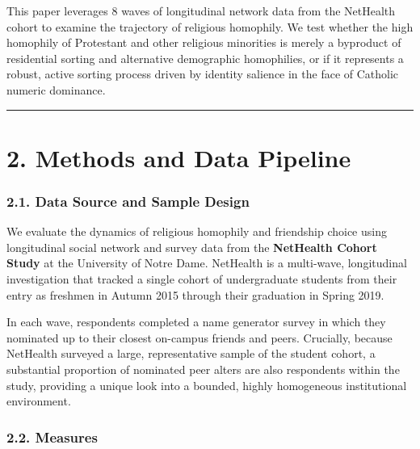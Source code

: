 \documentclass[
  letterpaper,
  DIV=11,
  numbers=noendperiod]{scrartcl}
\begin{document}
This paper leverages 8 waves of longitudinal network data from the
NetHealth cohort to examine the trajectory of religious homophily. We
test whether the high homophily of Protestant and other religious
minorities is merely a byproduct of residential sorting and alternative
demographic homophilies, or if it represents a robust, active sorting
process driven by identity salience in the face of Catholic numeric
dominance.

\begin{center}\rule{0.5\linewidth}{0.5pt}\end{center}

\section{2. Methods and Data Pipeline}\label{methods-and-data-pipeline}

\subsubsection{2.1. Data Source and Sample
Design}\label{data-source-and-sample-design}

We evaluate the dynamics of religious homophily and friendship choice
using longitudinal social network and survey data from the
\textbf{NetHealth Cohort Study} at the University of Notre Dame.
NetHealth is a multi-wave, longitudinal investigation that tracked a
single cohort of undergraduate students from their entry as freshmen in
Autumn 2015 through their graduation in Spring 2019.

In each wave, respondents completed a name generator survey in which
they nominated up to their closest on-campus friends and peers.
Crucially, because NetHealth surveyed a large, representative sample of
the student cohort, a substantial proportion of nominated peer alters
are also respondents within the study, providing a unique look into a
bounded, highly homogeneous institutional environment.

\subsubsection{2.2. Measures}\label{measures}
\end{document}
